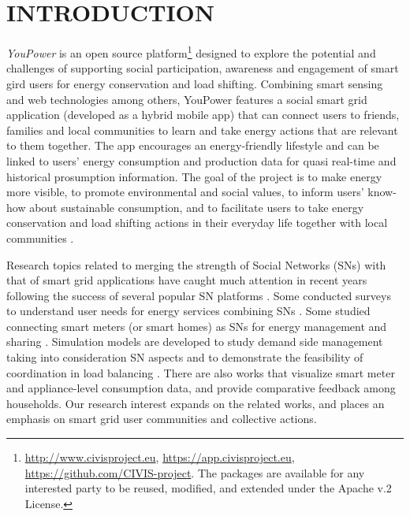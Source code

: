 \section{\uppercase{Introduction}}
\label{sec:introduction}

\noindent 
\textit{YouPower} is an open source platform\footnote{\url{http://www.civisproject.eu}, \url{https://app.civisproject.eu}, \url{https://github.com/CIVIS-project}. The packages are available for any
interested party to be reused, modified, and extended under the Apache v.2 License.} designed to explore the potential and challenges of supporting social participation, awareness and engagement of smart gird users for energy conservation and load shifting. Combining smart sensing and web technologies among others,
YouPower features a social smart grid application (developed as a hybrid mobile app) that can connect users to friends, families and local communities to learn and take energy actions that are relevant to them together. The app encourages an energy-friendly lifestyle and can be linked to users' energy consumption and production data for quasi real-time and historical prosumption information. 
% 
The goal of the project is to make energy more visible, to promote environmental and social values, to inform users' know-how about sustainable consumption, and to facilitate users to take energy conservation and load shifting actions in their everyday life together with local communities \cite{Huang2014,Huang2015c,Huang2016}. 
%  

Research topics related to merging the strength of Social Networks (SNs) with that of smart grid applications have caught much attention in recent years following the success of several popular SN platforms \cite{Boslet2010,Chima2011,Erickson2012,Fang2013,Huang2015}. 
% 
Some conducted surveys to understand user needs for energy services combining SNs \cite{Silva2012}. Some studied connecting smart meters (or smart homes) as SNs for
energy management and sharing \cite{Ciuciu2012,Steinheimer2012}. 
Simulation models are developed to study demand side management %
taking into consideration SN aspects \cite{De-Haan2011,Lei2012,Chatzidimitriou2013} and to demonstrate the feasibility of
coordination in load balancing \cite{Worm2013,Skopik2014}. There are also works that visualize smart meter and appliance-level consumption data, and provide comparative feedback among households\cite{Petkov2011,Weiss2012,Dillahunt2014}.
% 
Our research interest expands on the related works, and places an emphasis on smart grid user communities and collective actions. 


